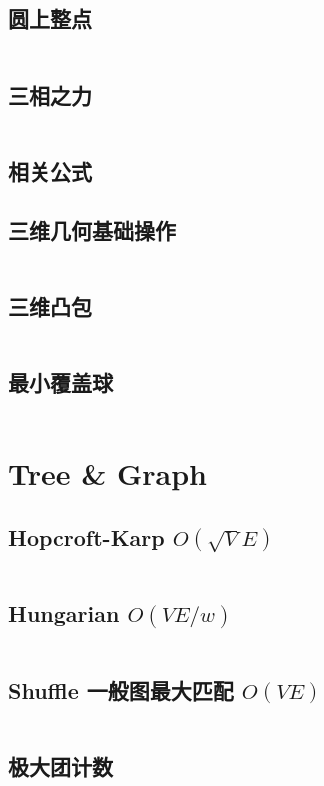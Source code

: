 \documentclass[titlepage, a4paper]{article}
\begin{document}
\begin{multicols}{2}
\begin{spacing}{0.6}
				\subsection{圆上整点}
					\inputminted{cpp}{src/Geometry/圆上整点.cpp}
				\subsection{三相之力}
				\inputminted{cpp}{src/Geometry/三角形.cpp}
				\subsection{相关公式}
					
				\subsection{三维几何基础操作}
					\inputminted{cpp}{src/Geometry/三维几何.cpp}
				\subsection{三维凸包}
					\inputminted{cpp}{src/Geometry/三维凸包.cpp}
				\subsection{最小覆盖球}
					\inputminted{cpp}{src/Geometry/最小覆盖球.cpp}
					\newpage
					
			\section{Tree \& Graph}
				\subsection{Hopcroft-Karp $O(\sqrt{V} E)$}
					\inputminted[highlightlines={5,9}]{cpp}{src/TreeandGraph/hk_skip2004.cpp}
				\subsection{Hungarian $O(V E / w)$}
					\inputminted{cpp}{src/TreeandGraph/Hungarian.cpp}
				\subsection{Shuffle 一般图最大匹配 $O(V E)$}
					\inputminted{cpp}{src/TreeandGraph/一般图最大匹配-shuffle.cpp}
				\subsection{极大团计数}
					\inputminted{cpp}{src/TreeandGraph/CliqueCount.cpp}

\end{spacing}
\end{multicols}
\end{document}
